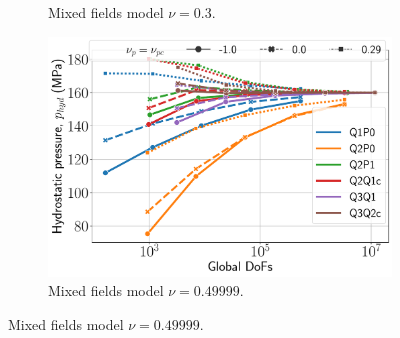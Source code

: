\documentclass{beamer}
\begin{document}
\begin{frame}
\begin{figure}[H]
\begin{subfigure}{.5\textwidth}
			\caption{Mixed fields model $\nu = 0.3$.}
		\end{subfigure}%
		\begin{subfigure}{.5\textwidth}
			\centering
			\includegraphics[width=.8\textwidth]{../figs/p-punch2-mixed-0.49999.pdf}
			\caption{Mixed fields model $\nu = 0.49999$.}
		\end{subfigure}
	\end{figure}
\end{frame}
\end{document}
